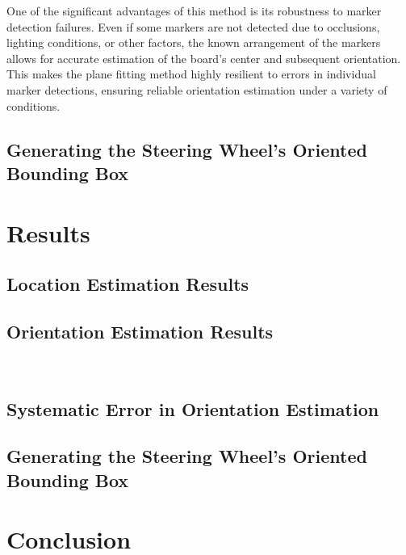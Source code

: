 One of the significant advantages of this method is its 
robustness to marker detection failures. Even if some markers 
are not detected due to occlusions, lighting conditions, or 
other factors, the known arrangement of the markers allows for 
accurate estimation of the board’s center and subsequent 
orientation. This makes the plane fitting method highly 
resilient to errors in individual marker detections, ensuring 
reliable orientation estimation under a variety of conditions.


\subsection{Generating the Steering Wheel’s Oriented Bounding Box}
\section{Results}
\subsection{Location Estimation Results}
\subsection{Orientation Estimation Results}
\
\subsection{Systematic Error in Orientation Estimation}
\subsection{Generating the Steering Wheel’s Oriented Bounding Box}

\section{Conclusion}